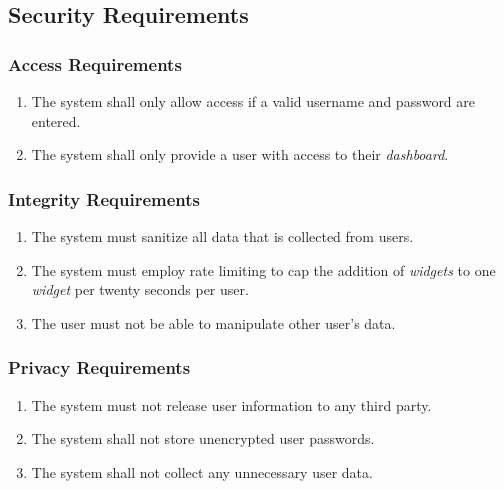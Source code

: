 \documentclass{article}
\begin{document}
\subsection{Security Requirements}
\label{sub:security_requirements}

\subsubsection{Access Requirements}
\label{ssub:access_requirements}
\begin{enumerate}[{SR}1. ]
	\item The system shall only allow access if a valid username and password are entered.
	\item The system shall only provide a user with access to their \textit{dashboard}.
\end{enumerate}

\subsubsection{Integrity Requirements}
\label{ssub:integrity_requirements}
\begin{enumerate}[{SR}1. ]
	\item The system must sanitize all data that is collected from users.
	\item The system must employ rate limiting to cap the addition of \textit{widgets} to one \textit{widget} per twenty seconds per user.
	\item The user must not be able to manipulate other user's data.
\end{enumerate}

\subsubsection{Privacy Requirements}
\label{ssub:privacy_requirements}
\begin{enumerate}[{SR}1. ]
	\item The system must not release user information to any third party.
	\item The system shall not store unencrypted user passwords.
	\item The system shall not collect any unnecessary user data.
\end{enumerate}
\end{document}
